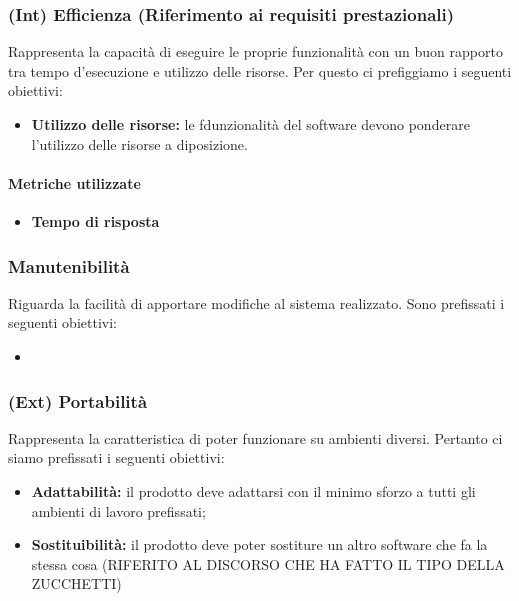 \subsubsection{(Int) Efficienza (Riferimento ai requisiti prestazionali)}
Rappresenta la capacità di eseguire le proprie funzionalità con un buon rapporto tra tempo d'esecuzione e utilizzo delle risorse. Per questo ci prefiggiamo i seguenti obiettivi:
\begin{itemize}
	\item \textbf{Utilizzo delle risorse:} le fdunzionalità del software devono ponderare l'utilizzo delle risorse a diposizione.
\end{itemize}
\paragraph{Metriche utilizzate}
\begin{itemize}
	\item \textbf{Tempo di risposta}
\end{itemize}
\begin{table}[!htpb]
\end{table}
\subsubsection{Manutenibilità}
Riguarda la facilità di apportare modifiche al sistema realizzato. Sono prefissati i seguenti obiettivi:
\begin{itemize}
	\item \textbf{}
\end{itemize}

\subsubsection{(Ext) Portabilità}
Rappresenta la caratteristica di poter funzionare su ambienti diversi. Pertanto ci siamo prefissati i seguenti obiettivi:
\begin{itemize}
	\item \textbf{Adattabilità:} il prodotto deve adattarsi con il minimo sforzo a tutti gli ambienti di lavoro prefissati;
	\item \textbf{Sostituibilità:} il prodotto deve poter sostiture un altro software che fa la stessa cosa (RIFERITO AL DISCORSO CHE HA FATTO IL TIPO DELLA ZUCCHETTI)
\end{itemize}
